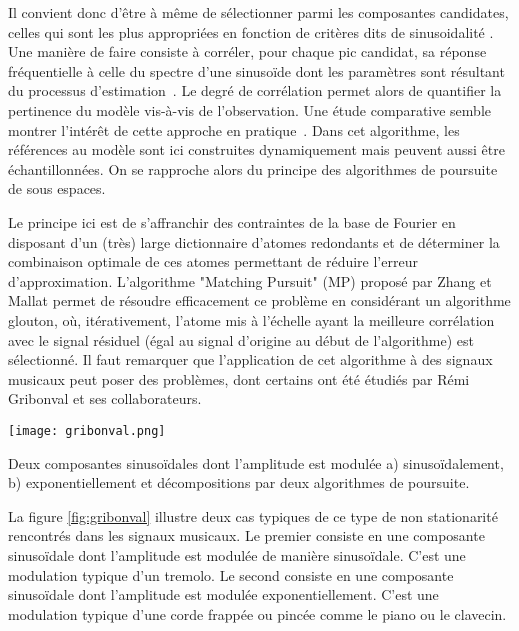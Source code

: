 Il convient donc d'être à même de sélectionner parmi les composantes candidates, celles qui sont les plus appropriées en fonction de critères dits de \og sinusoidalité \fg. Une manière de faire consiste à corréler, pour chaque pic candidat, sa réponse fréquentielle à celle du spectre d'une sinusoïde dont les paramètres sont résultant du processus d'estimation~\cite{peak-selection}. Le degré de corrélation permet alors de quantifier la pertinence du modèle vis-à-vis de l'observation. Une étude comparative semble montrer l'intérêt de cette approche en pratique~\cite{wells2010comparative}. Dans cet algorithme, les références au modèle sont ici construites dynamiquement mais peuvent aussi être échantillonnées. On se rapproche alors du principe des algorithmes de poursuite de sous espaces.

Le principe ici est de s'affranchir des contraintes de la base de Fourier en disposant d'un (très) large dictionnaire d'atomes redondants et de déterminer la combinaison optimale de ces atomes permettant de réduire l'erreur d'approximation. L'algorithme "Matching Pursuit" (MP) proposé par Zhang et Mallat\cite{mallat1993matching} permet de résoudre efficacement ce problème en considérant un algorithme glouton, où, itérativement, l'atome mis à l'échelle ayant la meilleure corrélation avec le signal résiduel (égal au signal d'origine au début de l'algorithme) est sélectionné. Il faut remarquer que l'application de cet algorithme à des signaux musicaux peut poser des problèmes, dont certains ont été étudiés par Rémi Gribonval et ses collaborateurs\cite{gribonval1996sound}. %

\begin{marginfigure}
  \texttt{[image: gribonval.png]}
  \caption{Deux composantes sinusoïdales dont l'amplitude est modulée a) sinusoïdalement, b) exponentiellement et décompositions par deux algorithmes de poursuite.}
  \label{fig:gribonval}
\end{marginfigure}

La figure \ref{fig:gribonval} illustre deux cas typiques de ce type de non stationarité rencontrés dans les signaux musicaux. Le premier consiste en une composante sinusoïdale dont l'amplitude est modulée de manière sinusoïdale. C'est une modulation typique d'un tremolo. Le second consiste en une composante sinusoïdale dont l'amplitude est modulée exponentiellement. C'est une modulation typique d'une corde frappée ou pincée comme le piano ou le clavecin.

